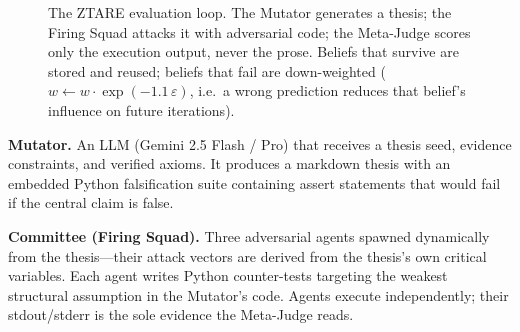 \documentclass[10pt,twocolumn]{article}
\begin{document}
\begin{figure}[t]
\centering
{}
\caption{The ZTARE evaluation loop. The Mutator generates a thesis;
  the Firing Squad attacks it with adversarial code; the Meta-Judge
  scores only the execution output, never the prose. Beliefs that
  survive are stored and reused; beliefs that fail are down-weighted
  ($w \leftarrow w \cdot \exp(-1.1\,\varepsilon)$, i.e.\ a wrong
  prediction reduces that belief's influence on future iterations).}
\label{fig:ztare}
\end{figure}

\textbf{Mutator.} An LLM (Gemini 2.5 Flash / Pro) that receives a
thesis seed, evidence constraints, and verified axioms. It produces a
markdown thesis with an embedded Python falsification suite containing
assert statements that would fail if the central claim is false.

\textbf{Committee (Firing Squad).} Three adversarial agents spawned
dynamically from the thesis---their attack vectors are derived from the
thesis's own critical variables. Each agent writes Python counter-tests
targeting the weakest structural assumption in the Mutator's code.
Agents execute independently; their stdout/stderr is the sole evidence
the Meta-Judge reads.
\end{document}
